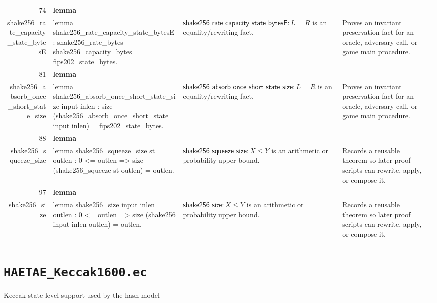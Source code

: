\documentclass[10pt]{article}
\newcommand{\ec}[1]{\begingroup\ttfamily\scriptsize #1\endgroup}
\begin{document}
\begin{longtable}{r L{0.17\textwidth} L{0.26\textwidth} L{0.27\textwidth} L{0.20\textwidth}}
74 & \textbf{lemma}\\\ec{shake256\_rate\_capacity\_state\_bytesE} & \ec{lemma shake256\_rate\_capacity\_state\_bytesE : shake256\_rate\_bytes + shake256\_capacity\_bytes = fips202\_state\_bytes.} & \(\mathsf{shake256\_rate\_capacity\_state\_bytesE} : L = R\) is an equality/rewriting fact. & Proves an invariant preservation fact for an oracle, adversary call, or game main procedure. \\
81 & \textbf{lemma}\\\ec{shake256\_absorb\_once\_short\_state\_size} & \ec{lemma shake256\_absorb\_once\_short\_state\_size input inlen : size (shake256\_absorb\_once\_short\_state input inlen) = fips202\_state\_bytes.} & \(\mathsf{shake256\_absorb\_once\_short\_state\_size} : L = R\) is an equality/rewriting fact. & Proves an invariant preservation fact for an oracle, adversary call, or game main procedure. \\
88 & \textbf{lemma}\\\ec{shake256\_squeeze\_size} & \ec{lemma shake256\_squeeze\_size st outlen : 0 <= outlen => size (shake256\_squeeze st outlen) = outlen.} & \(\mathsf{shake256\_squeeze\_size} : X \le Y\) is an arithmetic or probability upper bound. & Records a reusable theorem so later proof scripts can rewrite, apply, or compose it. \\
97 & \textbf{lemma}\\\ec{shake256\_size} & \ec{lemma shake256\_size input inlen outlen : 0 <= outlen => size (shake256 input inlen outlen) = outlen.} & \(\mathsf{shake256\_size} : X \le Y\) is an arithmetic or probability upper bound. & Records a reusable theorem so later proof scripts can rewrite, apply, or compose it. \\
\bottomrule
\end{longtable}

\clearpage
\section{\texorpdfstring{\texttt{HAETAE\_Keccak1600.ec}}{HAETAE Keccak1600.ec}}
Keccak state-level support used by the hash model
\end{document}
